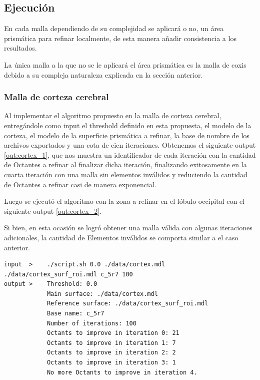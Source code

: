 \subsection{Ejecución}

En cada malla dependiendo de su complejidad se aplicará o no, un área prismática para refinar localmente, de esta manera añadir consistencia a los resultados.

La única malla a la que no se le aplicará el área prismática es la malla de coxis debido a su compleja naturaleza explicada en la sección anterior.

\subsubsection{Malla de corteza cerebral}

Al implementar el algoritmo propuesto en la malla de corteza cerebral, entregándole como input el threshold definido en esta propuesta, el modelo de la corteza, el modelo de la superficie prismática a refinar, la base de nombre de los archivos exportados y una cota de cien iteraciones.  Obtenemos el siguiente output \ref{out:cortex_1}, que nos muestra un identificador de cada iteración con la cantidad de Octantes a refinar al finalizar dicha iteración, finalizando exitosamente en la cuarta iteración con una malla sin elementos inválidos y reduciendo la cantidad de Octantes a refinar casi de manera exponencial.

Luego se ejecutó el algoritmo con la zona a refinar en el lóbulo occipital con el siguiente output \ref{out:cortex_2}.

Si bien, en esta ocasión se logró obtener una malla válida con algunas iteraciones adicionales, la cantidad de Elementos inválidos se comporta similar a el caso anterior.


\begin{lstlisting}[style=Console,caption={Output de ejecución algoritmo propuesto en malla de corteza cerebral con zona a refinar en lóbulo frontal.\\ Fuente: Elaboración propia.},label={out:cortex_1}]
input  >    ./script.sh 0.0 ./data/cortex.mdl ./data/cortex_surf_roi.mdl c_5r7 100
output >    Threshold: 0.0
            Main surface: ./data/cortex.mdl
            Reference surface: ./data/cortex_surf_roi.mdl
            Base name: c_5r7
            Number of iterations: 100
            Octants to improve in iteration 0: 21
            Octants to improve in iteration 1: 7
            Octants to improve in iteration 2: 2
            Octants to improve in iteration 3: 1
            No more Octants to improve in iteration 4.
\end{lstlisting}

